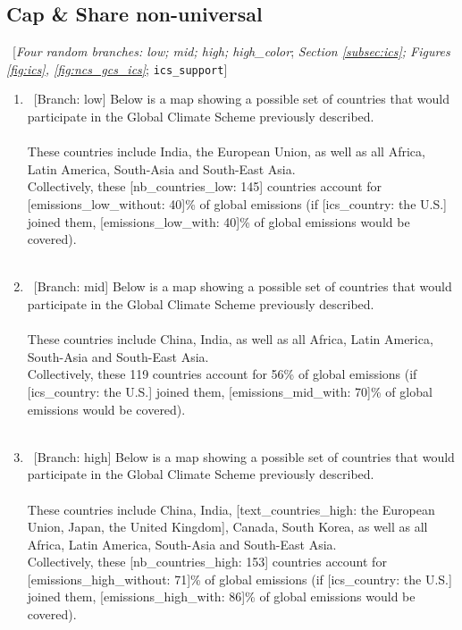  \subsection*{Cap \& Share non-universal} 
 ~[\textit{Four random branches: low; mid; high; high\_color}; \textit{Section \ref{subsec:ics}; Figures \ref{fig:ics}, \ref{fig:ncs_gcs_ics}}; 
 \verb|ics_support|] 
 \begin{enumerate}[resume] 
\item ~[Branch: low]  \label{q:gcs_low} Below is a map showing a possible set of countries that would participate in the Global Climate Scheme previously described.\\
~\\
These countries include India, the European Union, as well as all Africa, Latin America, South-Asia and South-East Asia.\\
Collectively, these [nb\_countries\_low: 145] countries account for [emissions\_low\_without: 40]\% of global emissions (if [ics\_country: the U.S.] joined them, [emissions\_low\_with: 40]\% of global emissions would be covered).\\
~\\ 

\item ~[Branch: mid] \label{q:gcs_mid} Below is a map showing a possible set of countries that would participate in the Global Climate Scheme previously described.\\
~\\
These countries include China, India, as well as all Africa, Latin America, South-Asia and South-East Asia.\\
Collectively, these 119 countries account for 56\% of global emissions (if [ics\_country: the U.S.] joined them, [emissions\_mid\_with: 70]\% of global emissions would be covered).\\
~\\ 

\item ~[Branch: high]  \label{q:gcs_high} Below is a map showing a possible set of countries that would participate in the Global Climate Scheme previously described.\\
~\\
These countries include China, India, [text\_countries\_high: the European Union, Japan, the United Kingdom], Canada, South Korea, as well as all Africa, Latin America, South-Asia and South-East Asia.~\\
Collectively, these [nb\_countries\_high: 153] countries account for [emissions\_high\_without: 71]\% of global emissions (if [ics\_country: the U.S.] joined them, [emissions\_high\_with: 86]\% of global emissions would be covered).\\
~\\ 


\end{enumerate}
